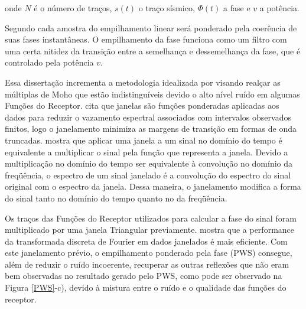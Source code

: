 onde $N$ é o número de traços, $s(t)$ o traço sísmico, $\Phi (t)$ a fase e $v$ a potência. 


Segundo \cite{schimmel_noise_1997} cada amostra do empilhamento linear será ponderado pela coerência de suas fases instantâneas. O empilhamento da fase funciona como um filtro com uma certa nitidez da transição entre a semelhança e dessemelhança da fase, que é controlado pela potência $v$. 

Essa dissertação incrementa a metodologia idealizada por \cite{schimmel_noise_1997} visando realçar as múltiplas de Moho que estão indistinguíveis devido o alto nível ruído em algumas Funções do Receptor. \cite{harris_use_1978} cita que janelas são funções ponderadas aplicadas aos dados para reduzir o vazamento espectral associados com intervalos observados finitos, logo o janelamento minimiza as margens de transição em formas de onda truncadas. \cite{andrade_soares_2007} mostra que aplicar uma janela a um sinal no domínio do tempo é equivalente a multiplicar o sinal pela função
que representa a janela. Devido a multiplicação no domínio do tempo ser equivalente à convolução no domínio da freqüência, o espectro de um sinal
janelado é a convolução do espectro do sinal original com o espectro da janela. Dessa maneira, o janelamento modifica a forma do sinal tanto no domínio do tempo quanto no da freqüência.

Os traços das Funções do Receptor utilizados para calcular a fase do sinal foram multiplicado por uma janela Triangular previamente. \cite{harris_use_1978} mostra que a performance da transformada discreta de Fourier em dados janelados é mais eficiente. Com este janelamento prévio, o empilhamento ponderado pela fase (PWS) consegue, além de reduzir o ruído incoerente, recuperar as outras reflexões que não eram bem observadas no resultado gerado pelo PWS, como pode ser observado na Figura \ref{PWS}-c), devido à mistura entre o ruído e o  qualidade das funções do receptor.

